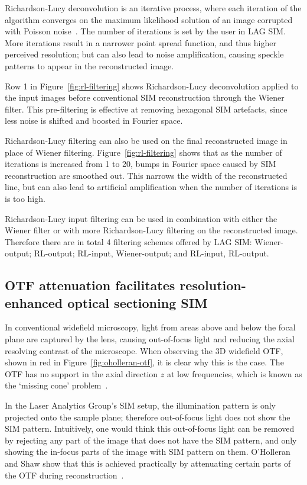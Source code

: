 Richardson-Lucy deconvolution is an iterative process, where each iteration of the algorithm converges on the maximum likelihood solution of an image corrupted with Poisson noise~\cite{richardson1972bayesian, lucy1974iterative}. 
The number of iterations is set by the user in LAG SIM.
More iterations result in a narrower point spread function, and thus higher perceived resolution; but can also lead to noise amplification, causing speckle patterns to appear in the reconstructed image.  

Row 1 in Figure~\ref{fig:rl-filtering} shows Richardson-Lucy deconvolution applied to the input images before conventional SIM reconstruction through the Wiener filter. 
This pre-filtering is effective at removing hexagonal SIM artefacts, since less noise is shifted and boosted in Fourier space.

Richardson-Lucy filtering can also be used on the final reconstructed image in place of Wiener filtering. 
Figure~\ref{fig:rl-filtering} shows that as the number of iterations is increased from 1 to 20, bumps in Fourier space caused by SIM reconstruction are smoothed out. 
This narrows the width of the reconstructed line, but can also lead to artificial amplification when the number of iterations is is too high. 

Richardson-Lucy input filtering can be used in combination with either the Wiener filter or with more Richardson-Lucy filtering on the reconstructed image. 
Therefore there are in total 4 filtering schemes offered by LAG SIM: Wiener-output; RL-output; RL-input, Wiener-output; and RL-input, RL-output. 

\subsection{OTF attenuation facilitates resolution-enhanced optical sectioning SIM}\label{sec:LAGSIM-OTF-attenuation}
In conventional widefield microscopy, light from areas above and below the focal plane are captured by the lens, causing out-of-focus light and reducing the axial resolving contrast of the microscope. 
When observing the 3D widefield OTF, shown in red in Figure~\ref{fig:oholleran-otf}, it is clear why this is the case. 
The OTF has no support in the axial direction $z$ at low frequencies, which is known as the `missing cone' problem~\cite{sheppard1992significance}. 

In the Laser Analytics Group's SIM setup, the illumination pattern is only projected onto the sample plane; therefore out-of-focus light does not show the SIM pattern.
Intuitively, one would think this out-of-focus light can be removed by rejecting any part of the image that does not have the SIM pattern, and only showing the in-focus parts of the image with SIM pattern on them. 
O'Holleran and Shaw show that this is achieved practically by attenuating certain parts of the OTF during reconstruction~\cite{oholleran2014optimized}.

